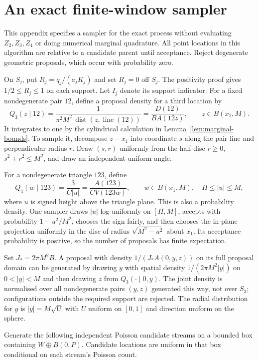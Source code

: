 \section{An exact finite-window sampler}
\label{app:sampler}

This appendix specifies a sampler for the exact process without evaluating $Z_2,Z_3,Z_4$ or doing numerical marginal quadrature. All point locations in this algorithm are relative to a candidate parent until acceptance. Reject degenerate geometric proposals, which occur with probability zero.

On $S_j$, put $R_j=q_j/(a_jK_j)$ and set $R_j=0$ off $S_j$. The positivity proof gives $1/2\leq R_j\leq1$ on each support. Let $I_j$ denote its support indicator. For a fixed nondegenerate pair $12$, define a proposal density for a third location by
\[
 Q_3(z\mid12)=\frac{1}{\pi^2M^2\,\operatorname{dist}(z,\operatorname{line}(12))}
 =\frac{D(12)}{B A(12z)},\qquad z\in B(x_1,M).
\]
It integrates to one by the cylindrical calculation in Lemma~\ref{lem:marginal-bounds}. To sample it, decompose $z-x_1$ into coordinate $s$ along the pair line and perpendicular radius $r$. Draw $(s,r)$ uniformly from the half-disc $r\geq0$, $s^2+r^2\leq M^2$, and draw an independent uniform angle.

For a nondegenerate triangle $123$, define
\[
 Q_4(w\mid123)=\frac{3}{C|u|}=\frac{A(123)}{CV(123w)},
 \qquad w\in B(x_1,M),\quad H\leq|u|\leq M,
\]
where $u$ is signed height above the triangle plane. This is also a probability density. One sampler draws $|u|$ log-uniformly on $[H,M]$, accepts with probability $1-u^2/M^2$, chooses the sign fairly, and then chooses the in-plane projection uniformly in the disc of radius $\sqrt{M^2-u^2}$ about $x_1$. Its acceptance probability is positive, so the number of proposals has finite expectation.

Set $J_*=2\pi M^2B$. A proposal with density $1/(J_*A(0,y,z))$ on its full proposal domain can be generated by drawing $y$ with spatial density $1/(2\pi M^2|y|)$ on $0<|y|<M$ and then drawing $z$ from $Q_3(\cdot\mid0,y)$. The joint density is normalised over all nondegenerate pairs $(y,z)$ generated this way, not over $S_3$; configurations outside the required support are rejected. The radial distribution for $y$ is $|y|=M\sqrt U$ with $U$ uniform on $[0,1]$ and direction uniform on the sphere.

Generate the following independent Poisson candidate streams on a bounded box containing $W\oplus B(0,P)$. Candidate locations are uniform in that box conditional on each stream's Poisson count.

